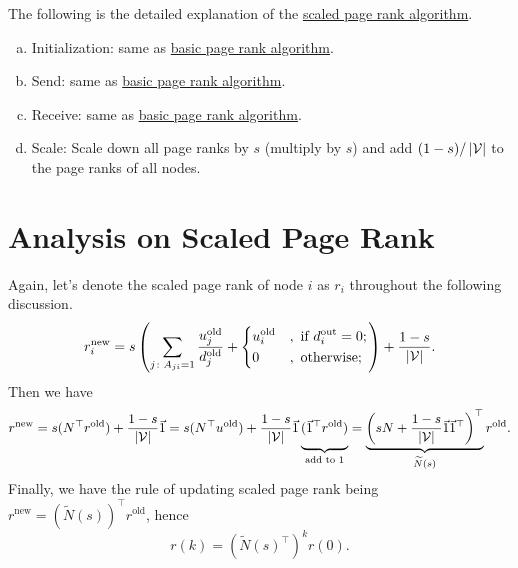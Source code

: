 \begin{remark}
	The following is the detailed explanation of the \hyperref[algo:scaled-page-rank-algorithm]{scaled page rank algorithm}.
	\begin{enumerate}[(a)]
		\item \label{algo:scaled-page-rank-algorithm:initialize} Initialization: same as \hyperref[algo:basic-page-rank-algorithm]{basic page rank algorithm}.
		\item \label{algo:scaled-page-rank-algorithm:send} Send: same as \hyperref[algo:basic-page-rank-algorithm]{basic page rank algorithm}.
		\item \label{algo:scaled-page-rank-algorithm:receive} Receive: same as \hyperref[algo:basic-page-rank-algorithm]{basic page rank algorithm}.
		\item \label{algo:scaled-page-rank-algorithm:scale} Scale: Scale down all page ranks by \(s\) (multiply by \(s\)) and
		      add \((1-s) / \left\vert \mathcal{\MakeUppercase{v}} \right\vert \) to the page ranks of all nodes.
	\end{enumerate}
\end{remark}

\section{Analysis on Scaled Page Rank}
Again, let's denote the scaled page rank of node \(i\) as \(r_i\) throughout the following discussion.
\[
	r_{i}^{\text{new}} = s\left(\sum\limits_{j\colon A_{ji} = 1} \frac{u_{j}^{\text{old}}}{d_{j}^{\text{old}}}+\begin{dcases}
		u_{i}^{\text{old}} & , \text{ if }d_{i}^{\text{out}} = 0; \\
		0                  & , \text{ otherwise};
	\end{dcases}\right)+\frac{1-s}{\vert \mathcal{V}\vert}.
\]
Then we have
\[
	\begin{split}
		r^{\text{new}} = s(N^{\top}r^{\text{old}})+\frac{1-s}{\vert \mathcal{V}\vert}\vec{1}
		= s(N^{\top}u^{\text{old}}) + \frac{1-s}{\vert \mathcal{V}\vert}\vec{1} \underbrace{\vphantom{\left(sN + \frac{1-s}{\vert \mathcal{V}\vert}\vec{1}\vec{1}^{\top}\right)^{\top}}(\vec{1}^{\top}r^{\text{old}})}_{\text{add to }1}
		= \underbrace{\left(sN + \frac{1-s}{\vert \mathcal{V}\vert}\vec{1}\vec{1}^{\top}\right)^{\top}}_{\widetilde{N}(s)} r^{\text{old}}.
	\end{split}
\]
Finally, we have the rule of updating scaled page rank being \(r^{\text{new}} = (\widetilde{N}(s))^{\top}r^{\text{old}}\), hence
\[
	r(k) = \left(\widetilde{N}(s)^{\top}\right)^k r(0).
\]

